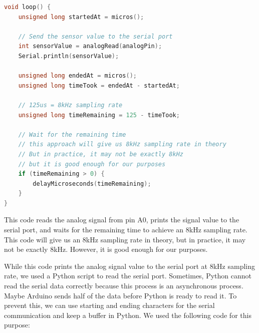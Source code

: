 \begin{lstlisting}[language=C++, caption=Arduino Code for 8kHz Sampling Rate, label=lst:arduino_code]
void loop() {
    unsigned long startedAt = micros();

    // Send the sensor value to the serial port
    int sensorValue = analogRead(analogPin);
    Serial.println(sensorValue);

    unsigned long endedAt = micros();
    unsigned long timeTook = endedAt - startedAt;

    // 125us = 8kHz sampling rate
    unsigned long timeRemaining = 125 - timeTook;

    // Wait for the remaining time
    // this approach will give us 8kHz sampling rate in theory
    // But in practice, it may not be exactly 8kHz 
    // but it is good enough for our purposes
    if (timeRemaining > 0) {
        delayMicroseconds(timeRemaining);
    }
}
\end{lstlisting}

This code reads the analog signal from pin A0, prints the signal value to the serial port, and waits for the remaining time to achieve an 8kHz sampling rate. This code will give us an 8kHz sampling rate in theory, but in practice, it may not be exactly 8kHz. However, it is good enough for our purposes.

\newpage
\thispagestyle{plain}

While this code prints the analog signal value to the serial port at 8kHz sampling rate, we used a Python script to read the serial port. Sometimes, Python cannot read the serial data correctly because this process is an asynchronous process. Maybe Arduino sends half of the data before Python is ready to read it. To prevent this, we can use starting and ending characters for the serial communication and keep a buffer in Python. We used the following code for this purpose:

